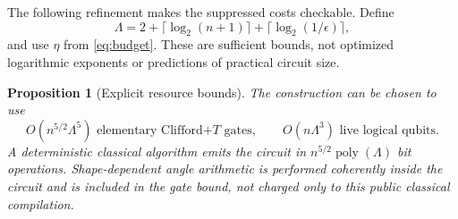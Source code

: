 \documentclass[11pt]{article}
\newtheorem{proposition}[theorem]{Proposition}
\theoremstyle{definition}
\newcommand{\poly}{\operatorname{poly}}
\begin{document}
The following refinement makes the suppressed costs checkable. Define
\[
 \Lambda=2+\lceil\log_2(n+1)\rceil+\lceil\log_2(1/\epsilon)\rceil,
\]
and use $\eta$ from \eqref{eq:budget}. These are sufficient bounds, not
optimized logarithmic exponents or predictions of practical circuit size.

\begin{proposition}[Explicit resource bounds]\label{prop:explicit}
The construction can be chosen to use
\[
 O(n^{5/2}\Lambda^5)\text{ elementary Clifford+$T$ gates},\qquad
 O(n\Lambda^3)\text{ live logical qubits}.
\]
A deterministic classical algorithm emits the circuit in
$n^{5/2}\poly(\Lambda)$ bit operations. Shape-dependent angle arithmetic
is performed coherently inside the circuit and is included in the gate
bound, not charged only to this public classical compilation.
\end{proposition}
\end{document}
